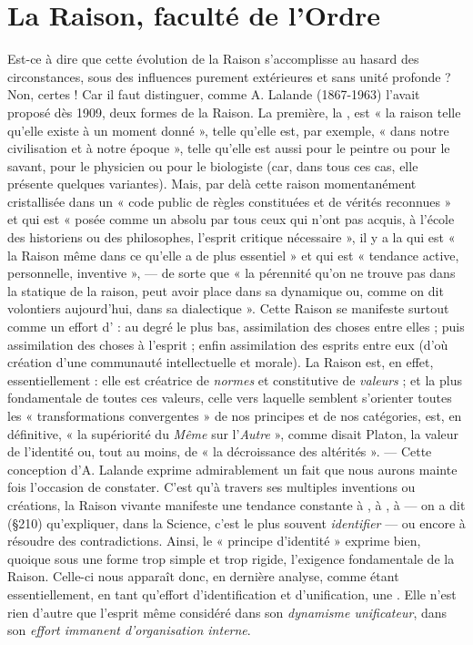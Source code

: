 \section{La Raison, faculté de l’Ordre}%
Est-ce à dire que cette
évolution de la Raison s’accomplisse au hasard des circonstances, sous
des influences purement extérieures et sans unité profonde ? Non,
certes ! Car il faut distinguer, comme A. Lalande (1867-1963) l'avait
proposé dès 1909, deux formes de la Raison. La première, la , est « la raison telle qu’elle existe à un moment donné »,
telle qu’elle est, par exemple, « dans notre civilisation et à notre
époque », telle qu’elle est aussi pour le peintre ou pour le savant, pour
le physicien ou pour le biologiste (car, dans tous ces cas, elle présente
quelques variantes). Mais, par delà cette raison momentanément
cristallisée dans un « code public de règles constituées et de vérités
reconnues » et qui est « posée comme un absolu par tous ceux qui
n’ont pas acquis, à l’école des historiens ou des philosophes, l'esprit
critique nécessaire », il y a la  qui est « la Raison
même dans ce qu’elle a de plus essentiel » et qui est « tendance active,
personnelle, inventive », — de sorte que « la pérennité qu’on ne
trouve pas dans la statique de la raison, peut avoir place dans sa
dynamique ou, comme on dit volontiers aujourd’hui, dans sa dialectique ». Cette Raison se manifeste surtout comme un effort d’ : au degré le plus bas, assimilation des choses entre elles ;
puis assimilation des choses à l'esprit ; enfin assimilation des esprits
entre eux (d’où création d’une communauté intellectuelle et morale).
La Raison est, en effet, essentiellement  : elle est créatrice
de {\it normes} et constitutive de {\it valeurs} ; et la plus fondamentale de toutes
ces valeurs, celle vers laquelle semblent s'orienter toutes les « transformations convergentes » de nos principes et de nos catégories, est,
en définitive, « la supériorité du {\it Même} sur l’{\it Autre} », comme disait
Platon, la valeur de l’identité ou, tout au moins, de « la décroissance
des altérités ». — Cette conception d’A. Lalande exprime admirablement un fait que nous aurons mainte fois l’occasion de constater.
C’est qu’à travers ses multiples inventions ou créations, la Raison
vivante manifeste une tendance constante à , à ,
à  — on a dit (\S 210) qu’expliquer,
dans la Science, c’est le plus souvent {\it identifier} — ou encore à résoudre
des contradictions. Ainsi, le « principe d’identité » exprime bien,
quoique sous une forme trop simple et trop rigide, l’exigence fondamentale de la Raison. Celle-ci nous apparaît donc, en dernière analyse,
comme étant essentiellement, en tant qu’effort d’identification et
d’unification, une . Elle n’est rien d’autre que l’esprit
même considéré dans son {\it dynamisme unificateur}, dans son {\it effort immanent d'organisation interne}.
